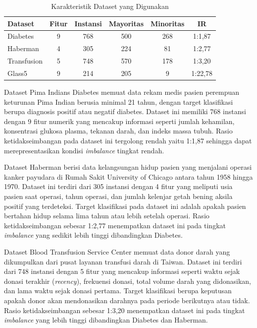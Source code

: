 \begin{table}[H]
\centering
\caption{Karakteristik Dataset yang Digunakan}
\label{table:3.dataset}
\begin{tabular}{|l|c|c|c|c|c|}
\hline
\textbf{Dataset} & \textbf{Fitur} & \textbf{Instansi} & \textbf{Mayoritas} & \textbf{Minoritas} & \textbf{IR} \\
\hline
Diabetes & 9 & 768 & 500 & 268 & 1:1,87 \\
\hline
Haberman & 4 & 305 & 224 & 81 & 1:2,77 \\
\hline
Transfusion & 5 & 748 & 570 & 178 & 1:3,20 \\
\hline
Glass5 & 9 & 214 & 205 & 9 & 1:22,78 \\
\hline
\end{tabular}
\end{table}

Dataset Pima Indians Diabetes memuat data rekam medis pasien perempuan keturunan Pima Indian berusia minimal 21 tahun, dengan target klasifikasi berupa diagnosis positif atau negatif diabetes. Dataset ini memiliki 768 instansi dengan 9 fitur numerik yang mencakup informasi seperti jumlah kehamilan, konsentrasi glukosa plasma, tekanan darah, dan indeks massa tubuh. Rasio ketidakseimbangan pada dataset ini tergolong rendah yaitu 1:1,87 sehingga dapat merepresentasikan kondisi \textit{imbalance} tingkat rendah.

Dataset Haberman berisi data kelangsungan hidup pasien yang menjalani operasi kanker payudara di Rumah Sakit University of Chicago antara tahun 1958 hingga 1970. Dataset ini terdiri dari 305 instansi dengan 4 fitur yang meliputi usia pasien saat operasi, tahun operasi, dan jumlah kelenjar getah bening aksila positif yang terdeteksi. Target klasifikasi pada dataset ini adalah apakah pasien bertahan hidup selama lima tahun atau lebih setelah operasi. Rasio ketidakseimbangan sebesar 1:2,77 menempatkan dataset ini pada tingkat \textit{imbalance} yang sedikit lebih tinggi dibandingkan Diabetes.

Dataset Blood Transfusion Service Center memuat data donor darah yang dikumpulkan dari pusat layanan transfusi darah di Taiwan. Dataset ini terdiri dari 748 instansi dengan 5 fitur yang mencakup informasi seperti waktu sejak donasi terakhir (\textit{recency}), frekuensi donasi, total volume darah yang didonasikan, dan lama waktu sejak donasi pertama. Target klasifikasi berupa keputusan apakah donor akan mendonasikan darahnya pada periode berikutnya atau tidak. Rasio ketidakseimbangan sebesar 1:3,20 menempatkan dataset ini pada tingkat \textit{imbalance} yang lebih tinggi dibandingkan Diabetes dan Haberman.

